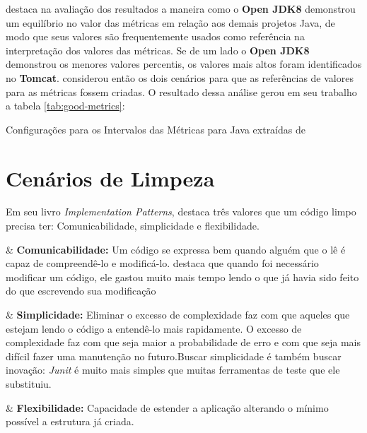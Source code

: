 	 
 destaca na avaliação dos resultados a maneira como o \textbf{Open JDK8} demonstrou um equilíbrio no valor das métricas em relação aos demais projetos Java, de modo que seus valores são frequentemente usados como referência na interpretação dos valores das métricas. Se de um lado o  \textbf{Open JDK8} demonstrou os menores valores percentis, os valores mais altos foram identificados no \textbf{Tomcat}.  considerou então os dois cenários para que as referências de valores para as métricas fossem criadas. O resultado dessa análise gerou em seu trabalho a tabela \ref{tab:good-metrics}:

\begin{table}[!ht]
	\begin{center}
		
	\caption{Configurações para os Intervalos das Métricas para Java extraídas de }
	\label{tab:good-metrics}
	\end{center}
	\end{table}
	\FloatBarrier
   


\section{Cenários de Limpeza} 

Em seu livro \textit{Implementation Patterns},  destaca três valores que um código limpo precisa ter: Comunicabilidade, simplicidade e flexibilidade.
	
\begin{easylist}[itemize]

	& \textbf{Comunicabilidade:} Um código se expressa bem quando alguém que o lê é capaz de compreendê-lo e modificá-lo.  destaca que quando foi necessário modificar um código, ele gastou muito mais tempo lendo o que já havia sido feito do que escrevendo sua modificação 
		
	& \textbf{Simplicidade:} Eliminar o excesso de complexidade faz com que aqueles que estejam lendo o código a entendê-lo mais rapidamente. O excesso de complexidade faz com que seja maior a probabilidade de erro e com que seja mais difícil fazer uma manutenção no futuro.Buscar simplicidade é também buscar inovação: \textit{Junit} é muito mais simples que muitas ferramentas de teste que ele substituiu.

	& \textbf{Flexibilidade:} Capacidade de estender a aplicação alterando o mínimo possível a estrutura já criada.
		
\end{easylist}	

